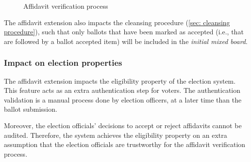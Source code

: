 \begin{figure}[ht]
    \caption{Affidavit verification process}
    \label{fig: affidavit verification process}
\end{figure}

The affidavit extension also impacts the cleansing procedure (\cref{sec: cleansing procedure}), such that only ballots that have been marked as accepted (i.e., that are followed by a ballot accepted item) will be included in the \textit{initial mixed board}.


\subsubsection{Impact on election properties}
The affidavit extension impacts the eligibility property of the election system. This feature acts as an extra authentication step for voters. The authentication validation is a manual process done by election officers, at a later time than the ballot submission. 

Moreover, the election officials' decisions to accept or reject affidavits cannot be audited. Therefore, the system achieves the eligibility property on an extra assumption that the election officials are trustworthy for the affidavit verification process.
